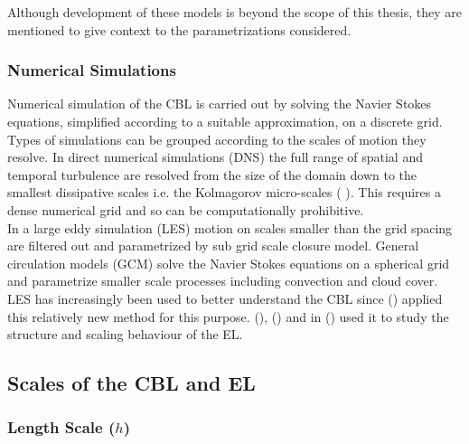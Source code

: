 Although development of these models is beyond the scope of this thesis, they are mentioned to give context to the parametrizations considered. \\         

\subsubsection{Numerical Simulations}
\label{subsubsec:}

Numerical simulation of the \acs{CBL} is carried out by solving the Navier Stokes equations, simplified according to a suitable approximation, on a discrete grid.  Types of simulations can be grouped according to the scales of motion they resolve.  In direct numerical simulations (\acs{DNS}) the full range of spatial and temporal turbulence are resolved from the size of the domain down to the smallest dissipative scales i.e. the Kolmagorov micro-scales (\citeauthor{Kolmog} \citeyear{Kolmog}).  This requires a dense numerical grid and so can be computationally prohibitive.\\

In a large eddy simulation (\acs{LES}) motion on scales smaller than the grid spacing are filtered out and parametrized by sub grid scale closure model. General circulation models (\acs{GCM}) solve the Navier Stokes equations on a spherical grid and parametrize smaller scale processes including convection and cloud cover.  \acs{LES} has increasingly been used to better understand the \acs{CBL} since \citeauthor{Deardorff72} (\citeyear{Deardorff72}) applied this relatively new method for this purpose.  \citeauthor{SullMoengStev} (\citeyear{SullMoengStev}), \citeauthor{FedConzMir04} (\citeyear{FedConzMir04}) and \citeauthor{BrooksFowler2} in (\citeyear{BrooksFowler2}) used it to study the structure and scaling behaviour of the \acs{EL}.\\

\subsection{Scales of the \acs{CBL} and \acs{EL}}
\label{subsec:scales}

\subsubsection{Length Scale ($h$)}
\label{subsubsec:}

